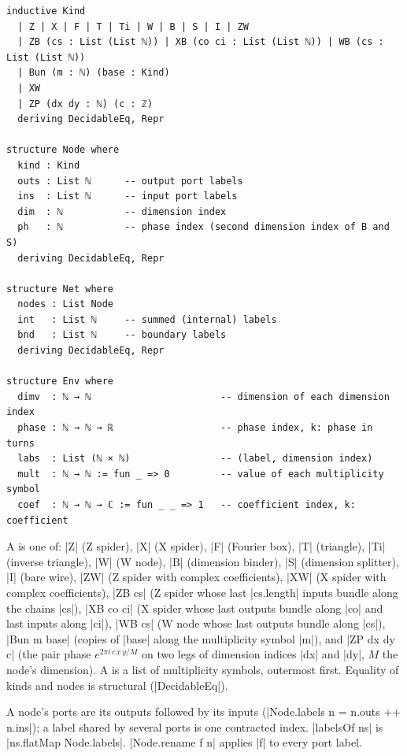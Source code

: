 \begin{lstlisting}[style=leancore]
inductive Kind
  | Z | X | F | T | Ti | W | B | S | I | ZW
  | ZB (cs : List (List ℕ)) | XB (co ci : List (List ℕ)) | WB (cs : List (List ℕ))
  | Bun (m : ℕ) (base : Kind)
  | XW
  | ZP (dx dy : ℕ) (c : ℤ)
  deriving DecidableEq, Repr

structure Node where
  kind : Kind
  outs : List ℕ      -- output port labels
  ins  : List ℕ      -- input port labels
  dim  : ℕ           -- dimension index
  ph   : ℕ           -- phase index (second dimension index of B and S)
  deriving DecidableEq, Repr

structure Net where
  nodes : List Node
  int   : List ℕ     -- summed (internal) labels
  bnd   : List ℕ     -- boundary labels
  deriving DecidableEq, Repr

structure Env where
  dimv  : ℕ → ℕ                       -- dimension of each dimension index
  phase : ℕ → ℕ → ℝ                   -- phase index, k: phase in turns
  labs  : List (ℕ × ℕ)                -- (label, dimension index)
  mult  : ℕ → ℕ := fun _ => 0         -- value of each multiplicity symbol
  coef  : ℕ → ℕ → ℂ := fun _ _ => 1   -- coefficient index, k: coefficient
\end{lstlisting}

\begin{definition}[Kinds]\label{def:lean-core-kind}
A  is one of: \lean|Z| (Z spider), \lean|X| (X spider), \lean|F| (Fourier box),
\lean|T| (triangle), \lean|Ti| (inverse triangle), \lean|W| (W node), \lean|B| (dimension binder),
\lean|S| (dimension splitter), \lean|I| (bare wire), \lean|ZW| (Z spider with complex
coefficients), \lean|XW| (X spider with complex coefficients), \lean|ZB cs| (Z spider whose last
\lean|cs.length| inputs bundle along the chains \lean|cs|), \lean|XB co ci| (X spider whose last
outputs bundle along \lean|co| and last inputs along \lean|ci|), \lean|WB cs| (W node whose last
outputs bundle along \lean|cs|), \lean|Bun m base| (copies of \lean|base| along the
multiplicity symbol \lean|m|), and \lean|ZP dx dy c| (the pair phase $e^{2\pi i\,c\,x\,y/M}$ on two
legs of dimension indices \lean|dx| and \lean|dy|, $M$ the node's dimension). A  is a list of multiplicity symbols, outermost first.
Equality of kinds and nodes is structural (\lean|DecidableEq|).
\end{definition}

A node's ports are its outputs followed by its inputs (\lean|Node.labels n = n.outs ++ n.ins|); a
label shared by several ports is one contracted index. \lean|labelsOf ns| is
\lean|ns.flatMap Node.labels|. \lean|Node.rename f n| applies \lean|f| to every port label.

